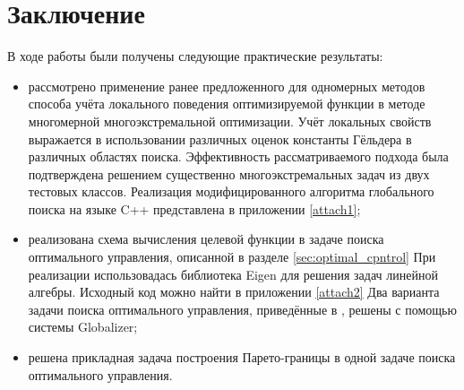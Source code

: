 \section{Заключение}
В ходе работы были получены следующие практические результаты:
\begin{itemize}
  \item рассмотрено применение ранее предложенного для одномерных методов способа учёта
  локального поведения оптимизируемой функции в методе многомерной многоэкстремальной
  оптимизации. Учёт локальных свойств выражается в использовании различных оценок
  константы Гёльдера в различных областях поиска. Эффективность рассматриваемого подхода
  была подтверждена решением существенно многоэкстремальных задач из двух тестовых классов.
  Реализация модифицированного алгоритма глобального поиска на языке C++ представлена
  в приложении \ref{attach1};
  \item реализована схема вычисления целевой функции в задаче поиска оптимального управления,
  описанной в разделе \ref{sec:optimal_cpntrol}
  При реализации использовадась библиотека Eigen \cite{eigenLib} для решения задач
  линейной алгебры. Исходный код можно найти в приложении \ref{attach2}
  Два варианта задачи поиска оптимального управления,
  приведённые в \cite{optControl}, решены с помощью системы Globalizer;
  \item решена прикладная задача построения Парето-границы в одной задаче поиска оптимального
  управления.
\end{itemize}
